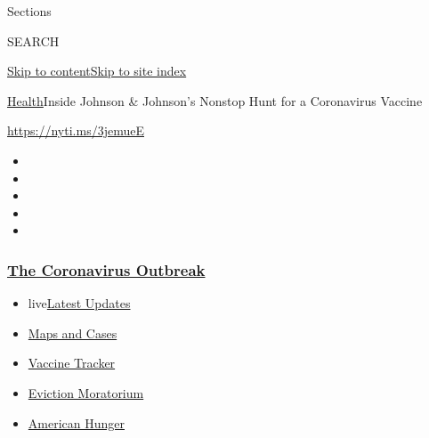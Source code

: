 Sections

SEARCH

\protect\hyperlink{site-content}{Skip to
content}\protect\hyperlink{site-index}{Skip to site index}

\href{/section/health}{Health}\textbar{}Inside Johnson \& Johnson's
Nonstop Hunt for a Coronavirus Vaccine

\url{https://nyti.ms/3jemueE}

\begin{itemize}
\item
\item
\item
\item
\item
\end{itemize}

\hypertarget{the-coronavirus-outbreak}{%
\subsubsection{\texorpdfstring{\href{https://www.nytimes3xbfgragh.onion/news-event/coronavirus?name=styln-coronavirus-national\&region=TOP_BANNER\&block=storyline_menu_recirc\&action=click\&pgtype=Article\&impression_id=dab10050-efba-11ea-8004-9385f1c1fc5b\&variant=undefined}{The
Coronavirus
Outbreak}}{The Coronavirus Outbreak}}\label{the-coronavirus-outbreak}}

\begin{itemize}
\tightlist
\item
  live\href{https://www.nytimes3xbfgragh.onion/2020/09/05/world/coronavirus-covid.html?name=styln-coronavirus-national\&region=TOP_BANNER\&block=storyline_menu_recirc\&action=click\&pgtype=Article\&impression_id=dab12760-efba-11ea-8004-9385f1c1fc5b\&variant=undefined}{Latest
  Updates}
\item
  \href{https://www.nytimes3xbfgragh.onion/interactive/2020/us/coronavirus-us-cases.html?name=styln-coronavirus-national\&region=TOP_BANNER\&block=storyline_menu_recirc\&action=click\&pgtype=Article\&impression_id=dab12761-efba-11ea-8004-9385f1c1fc5b\&variant=undefined}{Maps
  and Cases}
\item
  \href{https://www.nytimes3xbfgragh.onion/interactive/2020/science/coronavirus-vaccine-tracker.html?name=styln-coronavirus-national\&region=TOP_BANNER\&block=storyline_menu_recirc\&action=click\&pgtype=Article\&impression_id=dab12762-efba-11ea-8004-9385f1c1fc5b\&variant=undefined}{Vaccine
  Tracker}
\item
  \href{https://www.nytimes3xbfgragh.onion/2020/09/02/your-money/eviction-moratorium-covid.html?name=styln-coronavirus-national\&region=TOP_BANNER\&block=storyline_menu_recirc\&action=click\&pgtype=Article\&impression_id=dab12763-efba-11ea-8004-9385f1c1fc5b\&variant=undefined}{Eviction
  Moratorium}
\item
  \href{https://www.nytimes3xbfgragh.onion/interactive/2020/09/02/magazine/food-insecurity-hunger-us.html?name=styln-coronavirus-national\&region=TOP_BANNER\&block=storyline_menu_recirc\&action=click\&pgtype=Article\&impression_id=dab12764-efba-11ea-8004-9385f1c1fc5b\&variant=undefined}{American
  Hunger}
\end{itemize}

